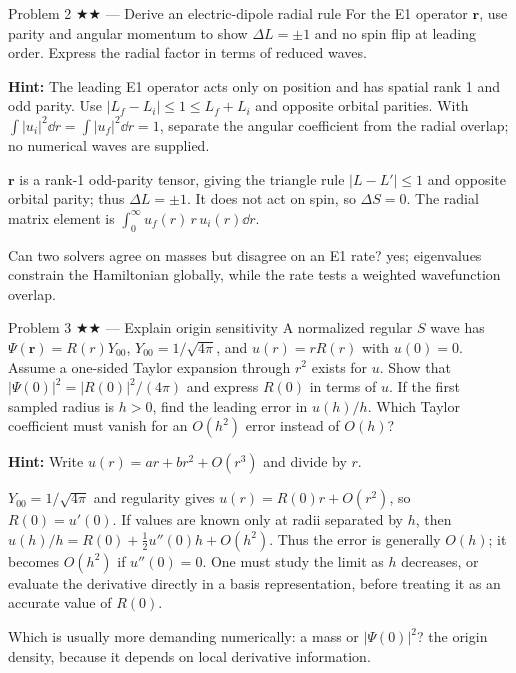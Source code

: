 \documentclass[11pt]{article}
\begin{document}
\begin{problem}{Problem 2 ★★ — Derive an electric-dipole radial rule}
For the E1 operator $\bm r$, use parity and angular momentum to show
$\Delta L=\pm1$ and no spin flip at leading order. Express the radial factor in
terms of reduced waves.

\textbf{Hint:} The leading E1 operator acts only on position and has spatial
rank 1 and odd parity. Use $|L_f-L_i|\le1\le L_f+L_i$ and opposite
orbital parities. With $\int|u_i|^2\dd r=\int|u_f|^2\dd r=1$,
separate the angular coefficient from the radial overlap; no numerical waves
are supplied.
\end{problem}
\begin{solution}
$\bm r$ is a rank-1 odd-parity tensor, giving the triangle rule
$|L-L'|\le1$ and opposite orbital parity; thus $\Delta L=\pm1$. It does not act
on spin, so $\Delta S=0$. The radial matrix element is
$\int_0^\infty u_f(r)\,r\,u_i(r)\dd r$.
\end{solution}
\begin{quiz}
Can two solvers agree on masses but disagree on an E1 rate? \answer yes;
eigenvalues constrain the Hamiltonian globally, while the rate tests a weighted
wavefunction overlap.
\end{quiz}

\begin{problem}{Problem 3 ★★ — Explain origin sensitivity}
A normalized regular $S$ wave has $\Psi(\bm r)=R(r)Y_{00}$,
$Y_{00}=1/\sqrt{4\pi}$, and $u(r)=rR(r)$ with $u(0)=0$.
Assume a one-sided Taylor expansion through $r^2$ exists for $u$.
Show that $|\Psi(0)|^2=|R(0)|^2/(4\pi)$ and express $R(0)$ in terms of $u$.
If the first sampled radius is $h>0$, find the leading error in $u(h)/h$.
Which Taylor coefficient must vanish for an $O(h^2)$ error instead of $O(h)$?

\textbf{Hint:} Write $u(r)=ar+br^2+O(r^3)$ and divide by $r$.
\end{problem}
\begin{solution}
$Y_{00}=1/\sqrt{4\pi}$ and regularity gives $u(r)=R(0)r+O(r^2)$, so
$R(0)=u'(0)$. If values are known only at radii separated by $h$, then
$u(h)/h=R(0)+\tfrac12u''(0)h+O(h^2)$.
Thus the error is generally $O(h)$; it becomes $O(h^2)$ if $u''(0)=0$. One must study the limit as $h$ decreases, or
evaluate the derivative directly in a basis representation, before treating it
as an accurate value of $R(0)$.
\end{solution}
\begin{quiz}
Which is usually more demanding numerically: a mass or $|\Psi(0)|^2$? \answer
the origin density, because it depends on local derivative information.
\end{quiz}
\end{document}
